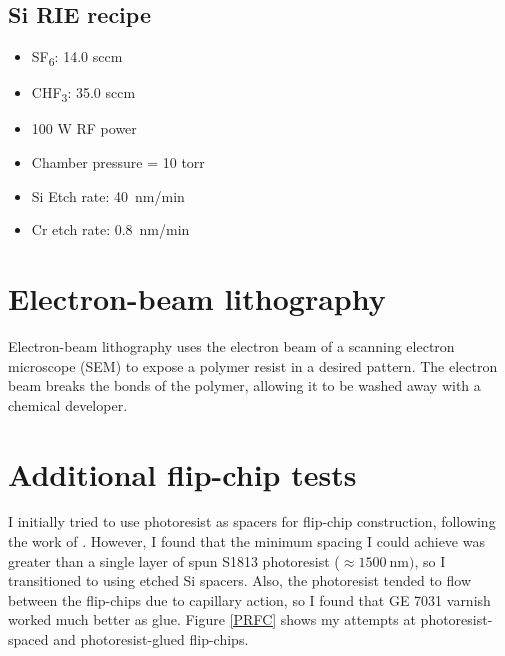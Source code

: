 \documentclass[double,12pt,1in,seploa]{beavtex}
\let\Oldsection\section
\renewcommand{\section}{\FloatBarrier\Oldsection}
\begin{document}
\section{Si RIE recipe}\label{Si RIE recipe}

\begin{itemize}
    \item SF\textsubscript{6}: 14.0 sccm
    \item CHF\textsubscript{3}: 35.0 sccm
    \item 100 W RF power
    \item Chamber pressure = 10 torr
    \item Si Etch rate: \SI{40}{\nano\meter/\minute}
    \item Cr etch rate: \SI{0.8}{\nano\meter/\minute}

\end{itemize}



\chapter{Electron-beam lithography} \label{electron-beam lithography} 
Electron-beam lithography uses the electron beam of a scanning electron microscope (SEM) to expose a polymer resist in a desired pattern. The electron beam breaks the bonds of the polymer, allowing it to be washed away with a chemical developer. 

\chapter{Additional flip-chip tests} \label{additional flip-chip tests}
I initially tried to use photoresist as spacers for flip-chip construction, following the work of \cite{bennaceur_mechanical_2015}. However, I found that the minimum spacing I could achieve was greater than a single layer of spun S1813 photoresist ($\approx \SI{1500}{\nano\meter})$, so I transitioned to using etched Si spacers. Also, the photoresist tended to flow between the flip-chips due to capillary action, so I found that GE 7031 varnish worked much better as glue. Figure \ref{PRFC} shows my attempts at photoresist-spaced and photoresist-glued flip-chips.
\end{document}
